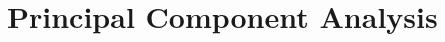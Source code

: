 \documentclass[../../../main.tex]{subfiles}
\begin{document}
\section{Principal Component Analysis}






\end{document}
